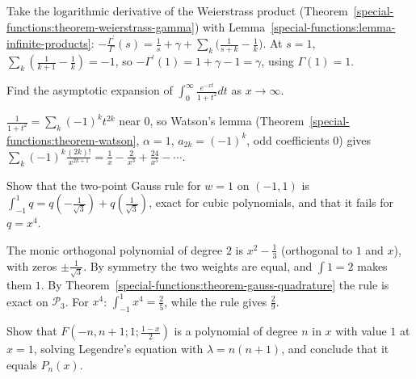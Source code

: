 \begin{solution}
Take the logarithmic derivative of the Weierstrass product (Theorem~\ref{special-functions:theorem-weierstrass-gamma}) with Lemma~\ref{special-functions:lemma-infinite-products}:
$-\frac{\Gamma^{\prime}}{\Gamma}(s) = \frac1s + \gamma + \sum_k\bigl(\frac{1}{s + k} - \frac1k\bigr)$. At $s = 1$, $\sum_k(\frac{1}{k+1} - \frac1k) = -1$, so $-\Gamma^{\prime}(1) = 1 + \gamma - 1 = \gamma$, using $\Gamma(1) = 1$.
\end{solution}

\begin{exercise}\label{special-functions:exercise-watson-example}
Find the asymptotic expansion of $\int_0^\infty\frac{e^{-xt}}{1 + t^2}dt$ as $x \to \infty$.
\end{exercise}

\begin{solution}
$\frac{1}{1 + t^2} = \sum_k(-1)^kt^{2k}$ near $0$, so Watson's lemma (Theorem~\ref{special-functions:theorem-watson}, $\alpha = 1$, $a_{2k} = (-1)^k$, odd coefficients $0$) gives $\sum_k(-1)^k\frac{(2k)!}{x^{2k+1}} = \frac1x - \frac{2}{x^3} + \frac{24}{x^5} - \cdots$.
\end{solution}

\begin{exercise}\label{special-functions:exercise-gauss-legendre}
Show that the two-point Gauss rule for $w = 1$ on $(-1, 1)$ is $\int_{-1}^1q = q(-\frac{1}{\sqrt3}) + q(\frac{1}{\sqrt3})$, exact for cubic polynomials, and that it fails for $q = x^4$.
\end{exercise}

\begin{solution}
The monic orthogonal polynomial of degree $2$ is $x^2 - \frac13$ (orthogonal to $1$ and $x$), with zeros $\pm\frac{1}{\sqrt3}$. By symmetry the two weights are equal, and $\int 1 = 2$ makes them $1$. By
Theorem~\ref{special-functions:theorem-gauss-quadrature} the rule is exact on $\mathcal{P}_3$. For $x^4$: $\int_{-1}^1x^4 = \frac25$, while the rule gives $\frac29$.
\end{solution}

\begin{exercise}\label{special-functions:exercise-legendre-hypergeometric}
Show that $F(-n, n + 1; 1; \frac{1 - x}{2})$ is a polynomial of degree $n$ in $x$ with value $1$ at $x = 1$, solving Legendre's equation with $\lambda = n(n + 1)$, and conclude that it equals $P_n(x)$.
\end{exercise}

